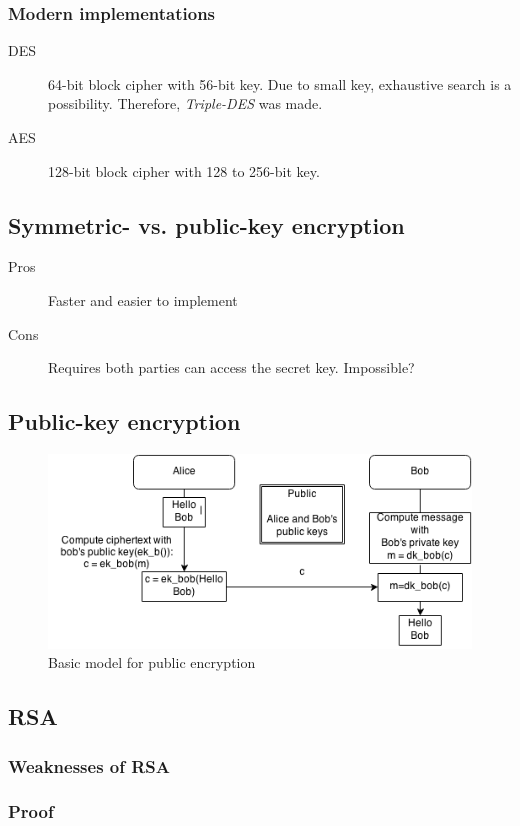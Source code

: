 \subsubsection*{Modern implementations}
\begin{description}
\item[DES] 64-bit block cipher with 56-bit key. Due to small key,
  exhaustive search is a possibility. Therefore, \emph{Triple-DES} was
  made.
\item[AES] 128-bit block cipher with 128 to 256-bit key.
\end{description}

\subsection{Symmetric- vs. public-key encryption}
\begin{description}
\item[Pros] Faster and easier to implement
\item[Cons] Requires both parties can access the secret key. Impossible?
\end{description}

\subsection{Public-key encryption}
\begin{figure}[H]
  \begin{centering}
    \includegraphics[width=15cm]{images/1-pub-enc}
    \caption{Basic model for public encryption}
  \end{centering}
  \label{fig:pub-enc}
\end{figure}

\subsection{RSA}


\subsubsection*{Weaknesses of RSA}


\subsubsection*{Proof}


